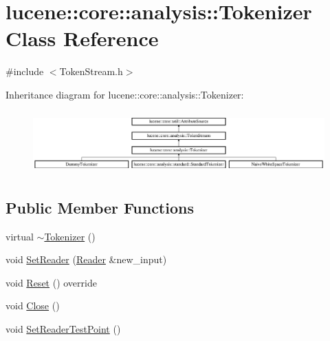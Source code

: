 \hypertarget{classlucene_1_1core_1_1analysis_1_1Tokenizer}{}\section{lucene\+:\+:core\+:\+:analysis\+:\+:Tokenizer Class Reference}
\label{classlucene_1_1core_1_1analysis_1_1Tokenizer}


{\ttfamily \#include $<$Token\+Stream.\+h$>$}

Inheritance diagram for lucene\+:\+:core\+:\+:analysis\+:\+:Tokenizer\+:\begin{figure}[H]
\begin{center}
\leavevmode
\includegraphics[height=2.416397cm]{classlucene_1_1core_1_1analysis_1_1Tokenizer}
\end{center}
\end{figure}
\subsection*{Public Member Functions}
\begin{DoxyCompactItemize}
\item 
virtual \mbox{\hyperlink{classlucene_1_1core_1_1analysis_1_1Tokenizer_a3f60f887953edf0f95ba5f36102f7017}{$\sim$\+Tokenizer}} ()
\item 
void \mbox{\hyperlink{classlucene_1_1core_1_1analysis_1_1Tokenizer_a3e5ea6dde1191ef370f42333bda69113}{Set\+Reader}} (\mbox{\hyperlink{classlucene_1_1core_1_1analysis_1_1Reader}{Reader}} \&new\+\_\+input)
\item 
void \mbox{\hyperlink{classlucene_1_1core_1_1analysis_1_1Tokenizer_a459d9c95a28f3b8aa3ad1cfde1568dd3}{Reset}} () override
\item 
void \mbox{\hyperlink{classlucene_1_1core_1_1analysis_1_1Tokenizer_a95c3c0e37e3276be69fa0992b0e45e94}{Close}} ()
\item 
void \mbox{\hyperlink{classlucene_1_1core_1_1analysis_1_1Tokenizer_ad088b90b87896ad88e029f4af370e525}{Set\+Reader\+Test\+Point}} ()
\end{DoxyCompactItemize}
